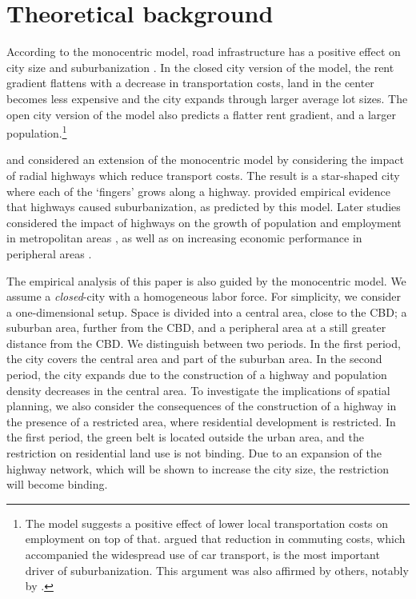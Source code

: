 \documentclass[a4paper,authoryear,review]{elsarticle}  	%
\begin{document}
\section{Theoretical background}	
	According to the monocentric model, road infrastructure has a positive effect on city size and suburbanization \citep{Alonso1964,Muth1969,Mills1967a}. In the closed city version of the model, the rent gradient flattens with a decrease in transportation costs, land in the center becomes less expensive and the city expands through larger average lot sizes. The open city version of the model also predicts a flatter rent gradient, and a larger population.\footnote{The \citet{Roback1982} model suggests a positive effect of lower local transportation costs on employment on top of that. \citet{Glaeser2004} argued that reduction in commuting costs, which accompanied the widespread use of car transport, is the most important driver of suburbanization. This argument was also affirmed by others, notably by \citet{Burchfield2006x}.}
	
	\citet{Anas1979} and \citet{Baum-Snow2007a} considered an extension of the monocentric model by considering the impact of radial highways which reduce transport costs. The result is a star-shaped city where each of the ‘fingers’ grows along a highway. \citet{Baum-Snow2007} provided empirical evidence that highways caused suburbanization, as predicted by this model. Later studies considered the impact of highways on the growth of population and employment in metropolitan areas , as well as on increasing economic performance in peripheral areas \citep{Banerjee2012,Chandra2000,Michaels2008}.
	
	The empirical analysis of this paper is also guided by the monocentric model. We assume a \textit{closed}-city with a homogeneous labor force. For simplicity, we consider a one-dimensional setup. Space is divided into a central area, close to the CBD; a suburban area, further from the CBD, and a peripheral area at a still greater distance from the CBD. We distinguish between two periods. In the first period, the city covers the central area and part of the suburban area. In the second period, the city expands due to the construction of a highway and population density decreases in the central area. To investigate the implications of spatial planning, we also consider the consequences of the construction of a highway in the presence of a restricted area, where residential development is restricted. In the first period, the green belt is located outside the urban area, and the restriction on residential land use is not binding. Due to an expansion of the highway network, which will be shown to increase the city size, the restriction will become binding.
	
\end{document}
